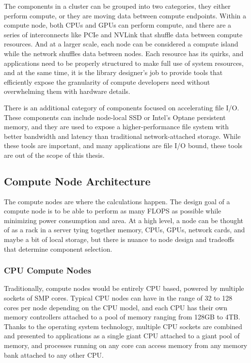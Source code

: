 The components in a cluster can be grouped into two categories, they either perform compute, or they are moving data between compute endpoints.
Within a compute node, both CPUs and GPUs can perform compute, and there are a series of interconnects like PCIe and NVLink that shuffle data between compute resources.
And at a larger scale, each node can be considered a compute island while the network shuffles data between nodes.
Each resource has its quirks, and applications need to be properly structured to make full use of system resources, and at the same time, it is the library designer's job to provide tools that efficiently expose the granularity of compute developers need without overwhelming them with hardware details.

There is an additional category of components focused on accelerating file I/O.
These components can include node-local SSD or Intel's Optane persistent memory, and they are used to expose a higher-performance file system with better bandwidth and latency than traditional network-attached storage.
While these tools are important, and many applications are file I/O bound, these tools are out of the scope of this thesis. 

\subsection{Compute Node Architecture}
The compute nodes are where the calculations happen.
The design goal of a compute node is to be able to perform as many FLOPS as possible while minimizing power consumption and area.
At a high level, a node can be thought of as a rack in a server tying together memory, CPUs, GPUs, network cards, and maybe a bit of local storage, but there is nuance to node design and tradeoffs that determine component selection. 

\subsubsection{CPU Compute Nodes}
Traditionally, compute nodes would be entirely CPU based, powered by multiple sockets of SMP cores.
Typical CPU nodes can have in the range of 32 to 128 cores per node depending on the CPU model, and each CPU has their own memory controllers attached to a pool of memory ranging from 128GB to 4TB.
Thanks to the operating system technology, multiple CPU sockets are combined and presented to applications as a single giant CPU attached to a giant pool of memory, and processes running on any core can access memory from any memory bank attached to any other CPU.

